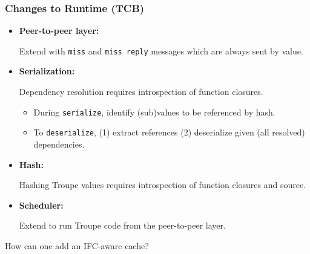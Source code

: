\documentclass[english, aspectratio=169]{beamer}
\begin{document}
\begin{frame}
  \frametitle{Changes to Runtime (TCB)}
  \begin{itemize}
  \item {\bf Peer-to-peer layer:}

    Extend with \texttt{miss} and \texttt{miss reply} messages which are always
    sent by value.

  \item {\bf Serialization:}

    Dependency resolution requires introspection of function closures.
    \begin{itemize}
    \item During \texttt{serialize}, identify (sub)values to be referenced by hash.

    \item To \texttt{deserialize}, (1) extract references (2) deserialize given
      (all resolved) dependencies.
    \end{itemize}

  \item {\bf Hash:}

    Hashing Troupe values requires introspection of function closures and source.

  \item {\bf Scheduler:}

    Extend to run Troupe code from the peer-to-peer layer.
  \end{itemize}
\end{frame}


\begin{frame}
  \begin{center}
    {
      \LARGE\bf

      How can one add an IFC-aware cache?
    }

  \end{center}
\end{frame}
\end{document}
